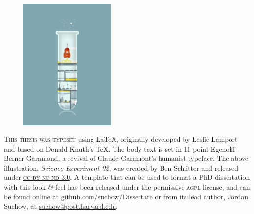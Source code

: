 \newpage

\begin{figure}
  \vspace{20pt}
  \centering
  \hspace*{-32pt}
  \includegraphics[width=0.42\textwidth]{endmatter/colophon.png}
\end{figure}

 \vspace*{200pt}

\begin{center}
\parbox{200pt}{\lettrine[lines=3,slope=-2pt,nindent=-4pt]{\textcolor{SchoolColor}{T}}{his thesis was typeset} using \LaTeX, originally developed by Leslie Lamport and based on Donald Knuth's \TeX. The body text is set in 11 point Egenolff-Berner Garamond, a revival of Claude Garamont's humanist typeface. The above illustration, \textit{Science Experiment 02}, was created by Ben Schlitter and released under \href{http://creativecommons.org/licenses/by-nc-nd/3.0/}{\textsc{cc by-nc-nd 3.0}}. A template that can be used to format a PhD dissertation with this look \textit{\&} feel has been released under the permissive \textsc{agpl} license, and can be found online at \href{https://github.com/suchow/Dissertate}{github.com/suchow/Dissertate} or from its lead author, Jordan Suchow, at \href{mailto:suchow@post.harvard.edu}{suchow@post.harvard.edu}.}
\end{center}
